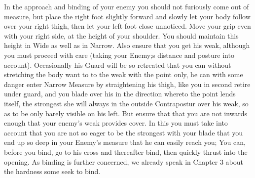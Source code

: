 In the approach and binding of your enemy you should not furiously
come out of measure, but place the right foot slightly forward and
slowly let your body follow over your right thigh, then let your left
foot close unnoticed. Move your grip even with your right side, at the
height of your shoulder. You should maintain this height in Wide as
well as in Narrow. Also ensure that you get his weak, although you
must proceed with care (taking your Enemy;s distance and posture into
account).  Occasionally his Guard will be so retreated that you can without
stretching the body want to to the weak with the point only, he can
with some danger enter Narrow Measure by straightening his thigh, like
you in second retire under guard, and you blade over his in the
direction whereto the point lends itself, the strongest  she will
always in the outside Contrapostur over his weak, so as to be only
barely visible on his left. But ensure that that you are not inwards
enough that your enemy's weak provides cover. In this you must take
into account that you are not so eager to be the strongest with your
blade that you end up so deep in your Enemy's measure that he can
easily reach you; You can, before you bind, go to his cross and
thereafter bind, then quickly thrust into the opening. As binding is
further concerned, we already speak in Chapter 3 about the hardness
some seek to bind.


